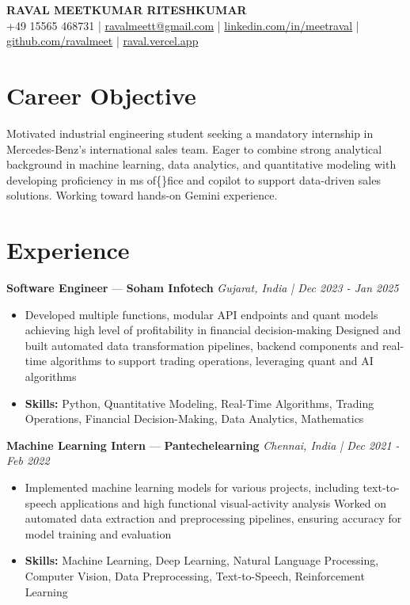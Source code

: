 \documentclass[a4paper,10pt]{article}
\begin{document}
\begin{center}
  {\Large\bfseries RAVAL MEETKUMAR RITESHKUMAR}\\[2pt]
  {\small +49 15565 468731 \;|\; \href{mailto:ravalmeett@gmail.com}{ravalmeett@gmail.com} \;|\; \href{https://www.linkedin.com/in/meetraval/}{linkedin.com/in/meetraval} \;|\; \href{https://github.com/ravalmeet}{github.com/ravalmeet} \;|\; \href{https://raval.vercel.app/}{raval.vercel.app}}
\end{center}
\vspace{-3pt}

\section*{Career Objective}
Motivated industrial engineering student seeking a mandatory internship in Mercedes-Benz's international sales team. Eager to combine strong analytical background in machine learning, data analytics, and quantitative modeling with developing proficiency in ms of\{\}fice and copilot to support data-driven sales solutions. Working toward hands-on Gemini experience.\par

\section*{Experience}
\textbf{Software Engineer} — \textbf{Soham Infotech} \hfill \textit{Gujarat, India \;|\; Dec 2023 - Jan 2025}\par
\vspace{1pt}
\begin{itemize}
  \item Developed multiple functions, modular API endpoints and quant models achieving high level of profitability in financial decision-making Designed and built automated data transformation pipelines, backend components and real-time algorithms to support trading operations, leveraging quant and AI algorithms
  \item \textbf{Skills:} Python, Quantitative Modeling, Real-Time Algorithms, Trading Operations, Financial Decision-Making, Data Analytics, Mathematics
\end{itemize}
\vspace{3pt}
\textbf{Machine Learning Intern} — \textbf{Pantechelearning} \hfill \textit{Chennai, India \;|\; Dec 2021 - Feb 2022}\par
\vspace{1pt}
\begin{itemize}
  \item Implemented machine learning models for various projects, including text-to-speech applications and high functional visual-activity analysis Worked on automated data extraction and preprocessing pipelines, ensuring accuracy for model training and evaluation
  \item \textbf{Skills:} Machine Learning, Deep Learning, Natural Language Processing, Computer Vision, Data Preprocessing, Text-to-Speech, Reinforcement Learning
\end{itemize}
\end{document}
